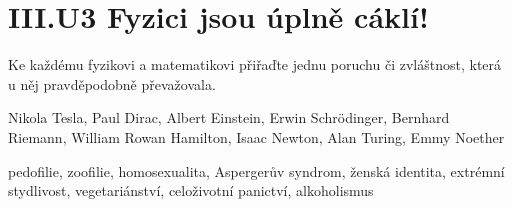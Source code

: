 \documentclass{../../../../style/mkimain}
\begin{document}
\section*{III.U3 Fyzici jsou úplně cáklí!}
\noindent Ke každému fyzikovi a matematikovi přiřaďte jednu poruchu či zvláštnost, která u něj pravděpodobně převažovala.
\\
\begin{mdframed}[frametitle={Jména}, frametitlealignment=\center, innerbottommargin=5px]
    \begin{center}
        Nikola Tesla, Paul Dirac, Albert Einstein, Erwin Schrödinger, Bernhard Riemann, William Rowan Hamilton, Isaac Newton, Alan Turing, Emmy Noether
    \end{center}
\end{mdframed}
\vspace{0.5cm}
\begin{mdframed}[frametitle={Zvláštnosti}, frametitlealignment=\center, innerbottommargin=5px]
    \begin{center}
        pedofilie, zoofilie, homosexualita, Aspergerův syndrom, ženská identita, extrémní stydlivost, vegetariánství, celoživotní panictví, alkoholismus
    \end{center}
\end{mdframed}
\end{document}
